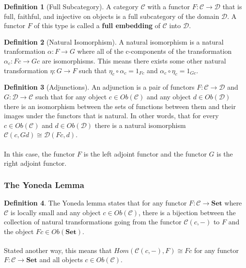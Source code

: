 \documentclass{article}
\theoremstyle{definition}
\newtheorem{definition}{Definition}
\begin{document}
\begin{definition}[Full Subcategory]
    A category $\mathcal{C}$ with a functor $F:\mathcal{C}\rightarrow\mathcal{D}$ that is full, faithful, and injective on objects is a full subcategory of the domain $\mathcal{D}$.
    A functor $F$ of this type is called a \textbf{full embedding} of $\mathcal{C}$ into $\mathcal{D}$.
\end{definition}


\begin{definition}[Natural Isomorphism]
    A natural isomorphism is a natural tranformation $\alpha:F\rightarrow G$ where all of the c-components of the transformation $\alpha_{c}:Fc\rightarrow Gc$ are isomorphisms.
    This means there exists some other natural transformation $\eta:G\rightarrow F$ such that $\eta_c\circ\alpha_c = 1_{Fc}$ and $\alpha_c\circ\eta_c = 1_{Gc}$.
\end{definition}


\begin{definition}[Adjunctions]
    An adjunction is a pair of functors $F:\mathcal{C}\rightarrow\mathcal{D}$ and $G:\mathcal{D}\rightarrow\mathcal{C}$ such that for any object $c\in Ob(\mathcal{C})$ and any object $d\in Ob(\mathcal{D})$ there is an isomorphism between the sets of functions between them and their images under the functors that is natural.
    In other words, that for every $c\in Ob(\mathcal{C})$ and $d\in Ob(\mathcal{D})$ there is a natural isomorphism $\mathcal{C}(c,Gd)\cong\mathcal{D}(Fc,d)$.\\\\
    In this case, the functor $F$ is the left adjoint functor and the functor $G$ is the right adjoint functor.
\end{definition}


\subsubsection*{The Yoneda Lemma}
\begin{definition}
    The Yoneda lemma states that for any functor $F:\mathcal{C}\rightarrow\mathbf{Set}$ where $\mathcal{C}$ is locally small and any object $c\in Ob(\mathcal{C})$, there is a bijection between the collection of natural transformations going from the functor $\mathcal{C}(c,-)$ to $F$ and the object $Fc\in Ob(\mathbf{Set})$.
    \\\\Stated another way, this means that $Hom(\mathcal{C}(c,-), F)\cong Fc$ for any functor $F:\mathcal{C}\rightarrow\mathbf{Set}$ and all objects $c\in Ob(\mathcal{C})$.

\end{definition}
\end{document}
